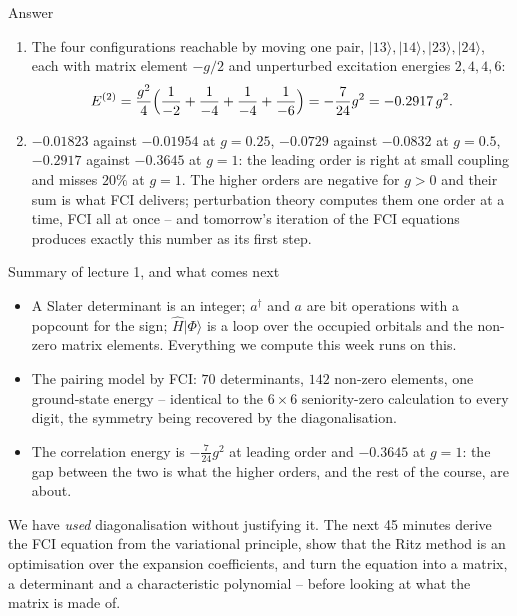 \documentclass[aspectratio=169,10pt]{beamer}
\newcounter{thinkctr}
\newcommand{\thinka}[1]{%
  \begin{tcolorbox}[colback=paleteal,colframe=teal,title={\bfseries Answer to pause \#\thethinkctr}]
  #1
  \end{tcolorbox}}
\newcommand{\mbbox}[1]{%
  \begin{tcolorbox}[colback=paleblue,colframe=uioblue,title={\bfseries Many-body connection}]
  #1
  \end{tcolorbox}}
\newcommand{\ket}[1]{\vert #1\rangle}
\begin{document}
\begin{frame}{Answer}
  \thinka{
  \begin{enumerate}
    \item The four configurations reachable by moving one pair, $\ket{13},\ket{14},\ket{23},\ket{24}$, each with matrix element $-g/2$ and unperturbed excitation energies $2,4,4,6$:
    \[
      E^{(2)}=\frac{g^2}{4}\Bigl(\frac{1}{-2}+\frac{1}{-4}+\frac{1}{-4}+\frac{1}{-6}\Bigr)=-\frac{7}{24}g^2=-0.2917\,g^2 .
    \]
    \item $-0.01823$ against $-0.01954$ at $g=0.25$, $-0.0729$ against $-0.0832$ at $g=0.5$, $-0.2917$ against $-0.3645$ at $g=1$: the leading order is right at small coupling and misses $20\%$ at $g=1$. The higher orders are negative for $g>0$ and their sum is what FCI delivers; perturbation theory computes them one order at a time, FCI all at once -- and tomorrow's iteration of the FCI equations produces exactly this number as its first step.
  \end{enumerate}}
\end{frame}

\begin{frame}{Summary of lecture 1, and what comes next}
  \begin{itemize}
    \item A Slater determinant is an integer; $a^{\dagger}$ and $a$ are bit operations with a popcount for the sign; $\hat{H}\ket{\Phi}$ is a loop over the occupied orbitals and the non-zero matrix elements. Everything we compute this week runs on this.
    \item The pairing model by FCI: $70$ determinants, $142$ non-zero elements, one ground-state energy -- identical to the $6\times6$ seniority-zero calculation to every digit, the symmetry being recovered by the diagonalisation.
    \item The correlation energy is $-\frac{7}{24}g^2$ at leading order and $-0.3645$ at $g=1$: the gap between the two is what the higher orders, and the rest of the course, are about.
  \end{itemize}
  \mbbox{We have \emph{used} diagonalisation without justifying it. The next 45 minutes derive the FCI equation from the variational principle, show that the Ritz method is an optimisation over the expansion coefficients, and turn the equation into a matrix, a determinant and a characteristic polynomial -- before looking at what the matrix is made of.}
\end{frame}

\end{document}
